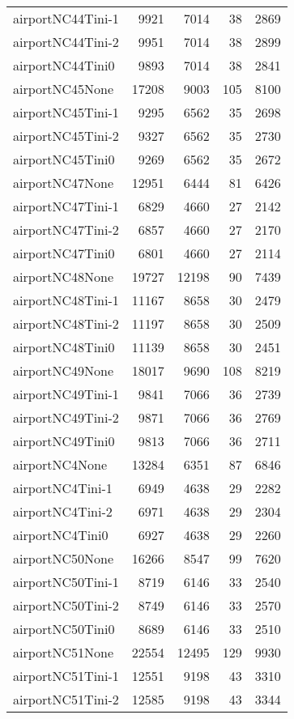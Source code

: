 \begin{longtable}{lrrrr}
airportNC44Tini-1 & 9921 & 7014 & 38 & 2869 \\
airportNC44Tini-2 & 9951 & 7014 & 38 & 2899 \\
airportNC44Tini0 & 9893 & 7014 & 38 & 2841 \\
airportNC45None & 17208 & 9003 & 105 & 8100 \\
airportNC45Tini-1 & 9295 & 6562 & 35 & 2698 \\
airportNC45Tini-2 & 9327 & 6562 & 35 & 2730 \\
airportNC45Tini0 & 9269 & 6562 & 35 & 2672 \\
airportNC47None & 12951 & 6444 & 81 & 6426 \\
airportNC47Tini-1 & 6829 & 4660 & 27 & 2142 \\
airportNC47Tini-2 & 6857 & 4660 & 27 & 2170 \\
airportNC47Tini0 & 6801 & 4660 & 27 & 2114 \\
airportNC48None & 19727 & 12198 & 90 & 7439 \\
airportNC48Tini-1 & 11167 & 8658 & 30 & 2479 \\
airportNC48Tini-2 & 11197 & 8658 & 30 & 2509 \\
airportNC48Tini0 & 11139 & 8658 & 30 & 2451 \\
airportNC49None & 18017 & 9690 & 108 & 8219 \\
airportNC49Tini-1 & 9841 & 7066 & 36 & 2739 \\
airportNC49Tini-2 & 9871 & 7066 & 36 & 2769 \\
airportNC49Tini0 & 9813 & 7066 & 36 & 2711 \\
airportNC4None & 13284 & 6351 & 87 & 6846 \\
airportNC4Tini-1 & 6949 & 4638 & 29 & 2282 \\
airportNC4Tini-2 & 6971 & 4638 & 29 & 2304 \\
airportNC4Tini0 & 6927 & 4638 & 29 & 2260 \\
airportNC50None & 16266 & 8547 & 99 & 7620 \\
airportNC50Tini-1 & 8719 & 6146 & 33 & 2540 \\
airportNC50Tini-2 & 8749 & 6146 & 33 & 2570 \\
airportNC50Tini0 & 8689 & 6146 & 33 & 2510 \\
airportNC51None & 22554 & 12495 & 129 & 9930 \\
airportNC51Tini-1 & 12551 & 9198 & 43 & 3310 \\
airportNC51Tini-2 & 12585 & 9198 & 43 & 3344 \\

\end{longtable}

